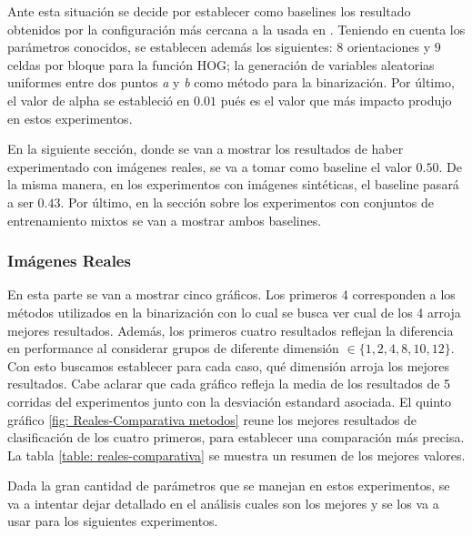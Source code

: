 	Ante esta situación se decide por establecer como baselines los resultado obtenidos por la configuración más cercana a la usada en \cite{wang}. Teniendo en cuenta los parámetros conocidos, se establecen además los siguientes: $8$ orientaciones y $9$ celdas por bloque para la función HOG; la generación de variables aleatorias uniformes entre dos puntos \textit{a} y \textit{b} como método para la binarización. Por último, el valor de alpha se estableció en $0.01$ pués es el valor que más impacto produjo en estos experimentos.
	
	En la siguiente sección, donde se van a mostrar los resultados de haber experimentado con imágenes reales, se va a tomar como baseline el valor $0.50$. De la misma manera, en los experimentos con imágenes sintéticas, el baseline pasará a ser $0.43$. Por último, en la sección sobre los experimentos con conjuntos de entrenamiento mixtos se van a mostrar ambos baselines.

	\subsubsection{Imágenes Reales}
	
	En esta parte se van a mostrar cinco gráficos. Los primeros 4 corresponden a los métodos utilizados en la binarización con lo cual se busca ver cual de los 4 arroja mejores resultados. Además, los primeros cuatro resultados reflejan la diferencia en performance al considerar grupos de diferente dimensión $\in \{ 1, 2, 4, 8, 10, 12\}$. Con esto buscamos establecer para cada caso, qué dimensión arroja los mejores resultados. Cabe aclarar que cada gráfico refleja la media de los resultados de 5 corridas del experimentos junto con la desviación estandard asociada. El quinto gráfico \ref{fig: Reales-Comparativa metodos} reune los mejores resultados de clasificación de los cuatro primeros, para establecer una comparación más precisa. La tabla \ref{table: reales-comparativa} se muestra un resumen de los mejores valores.
	
	 Dada la gran cantidad de parámetros que se manejan en estos experimentos, se va a intentar dejar detallado en el análisis cuales son los mejores y se los va a usar para los siguientes experimentos.
		
